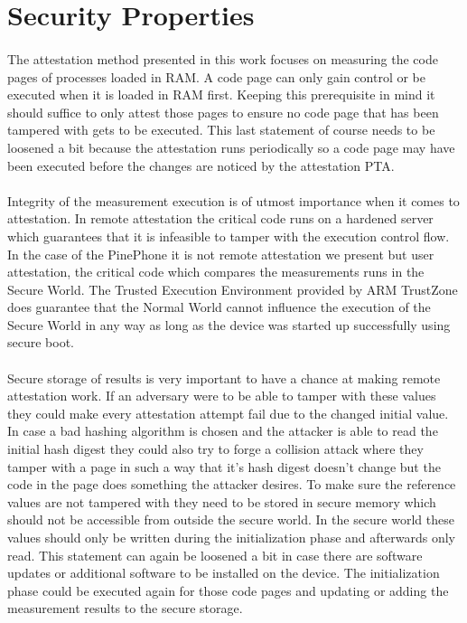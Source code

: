 \section{Security Properties}

\paragraph*{}%
The attestation method presented in this work focuses on measuring the code pages of processes loaded in RAM. A code page can only gain control or be executed when it is loaded in RAM first. Keeping this prerequisite in mind it should suffice to only attest those pages to ensure no code page that has been tampered with gets to be executed. This last statement of course needs to be loosened a bit because the attestation runs periodically so a code page may have been executed before the changes are noticed by the attestation PTA.

\paragraph*{}%
Integrity of the measurement execution is of utmost importance when it comes to attestation. In remote attestation the critical code runs on a hardened server which guarantees that it is infeasible to tamper with the execution control flow. In the case of the PinePhone it is not remote attestation we present but user attestation, the critical code which compares the measurements runs in the Secure World. The Trusted Execution Environment provided by ARM TrustZone does guarantee that the Normal World cannot influence the execution of the Secure World in any way as long as the device was started up successfully using secure boot.

\paragraph*{}%
Secure storage of results is very important to have a chance at making remote attestation work. If an adversary were to be able to tamper with these values they could make every attestation attempt fail due to the changed initial value. In case a bad hashing algorithm is chosen and the attacker is able to read the initial hash digest they could also try to forge a collision attack where they tamper with a page in such a way that it's hash digest doesn't change but the code in the page does something the attacker desires. To make sure the reference values are not tampered with they need to be stored in secure memory which should not be accessible from outside the secure world. In the secure world these values should only be written during the initialization phase and afterwards only read. This statement can again be loosened a bit in case there are software updates or additional software to be installed on the device. The initialization phase could be executed again for those code pages and updating or adding the measurement results to the secure storage. 


